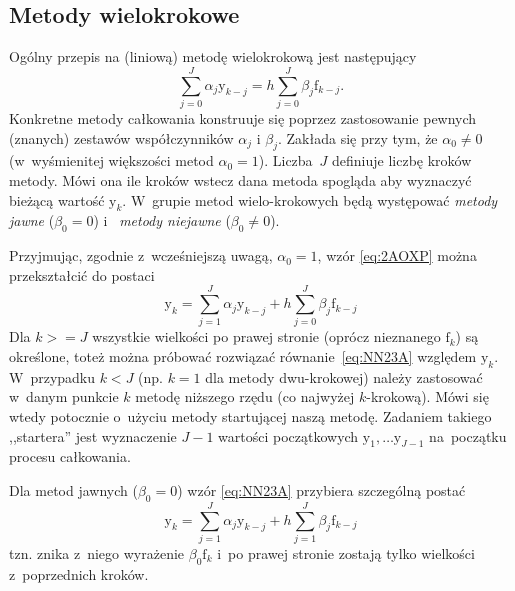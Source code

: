 \documentclass[paper=a4,DIV=12]{tmmlab}
\newcommand{\brm}[1]{\bm{\mathrm{#1}}}
\begin{document}
\begin{appendices}
\subsection{Metody wielokrokowe}
\label{sec:QS6QT}

Ogólny przepis na (liniową) metodę wielokrokową jest następujący
\begin{equation}
  \sum_{j=0}^J \alpha_j \brm{y}_{k-j} = h \sum_{j=0}^J \beta_j \brm{f}_{k-j}.
  \label{eq:2AOXP}
\end{equation}
Konkretne metody całkowania konstruuje się poprzez zastosowanie pewnych
(znanych) zestawów współczynników $\alpha_j$ i $\beta_j$. Zakłada się przy tym,
że $\alpha_0 \neq 0$ (w~wyśmienitej większości metod $\alpha_0 = 1$).
Liczba~$J$ definiuje liczbę kroków metody. Mówi ona ile kroków wstecz dana
metoda spogląda aby wyznaczyć bieżącą wartość $\brm{y}_k$. W~grupie metod
wielo-krokowych będą występować {\em metody jawne} ($\beta_0 = 0$) i~{\em
metody niejawne} ($\beta_0 \neq 0$).

Przyjmując, zgodnie z~wcześniejszą uwagą, $\alpha_0 = 1$, wzór \eqref{eq:2AOXP}
można przekształcić do postaci
\begin{equation}
  \brm{y}_k = \sum_{j=1}^J \alpha_j \brm{y}_{k-j} + h \sum_{j=0}^J \beta_j \brm{f}_{k-j}
  \label{eq:NN23A}
\end{equation}
Dla $k>=J$ wszystkie wielkości po prawej stronie (oprócz nieznanego
$\brm{f}_k$) są określone, toteż można próbować rozwiązać
równanie~\eqref{eq:NN23A} względem $\brm{y}_k$. W~przypadku $k < J$ (np. $k=1$
dla metody dwu-krokowej) należy zastosować w~danym punkcie $k$ metodę niższego
rzędu (co najwyżej $k$-krokową). Mówi się wtedy potocznie o~użyciu metody
startującej naszą metodę. Zadaniem takiego ,,startera'' jest wyznaczenie $J-1$
wartości początkowych $\brm{y}_1, \dots \brm{y}_{J-1}$ na~początku procesu
całkowania.

Dla metod jawnych ($\beta_0 = 0$) wzór \eqref{eq:NN23A} przybiera szczególną
postać
\begin{equation}
  \brm{y}_k = \sum_{j=1}^J \alpha_j \brm{y}_{k-j} + h \sum_{j=1}^J \beta_j \brm{f}_{k-j}
  \label{eq:EQ0F7}
\end{equation}
tzn. znika z~niego wyrażenie $\beta_0 \brm{f}_k$ i~po prawej stronie zostają
tylko wielkości z~poprzednich kroków.


\end{appendices}
\end{document}
